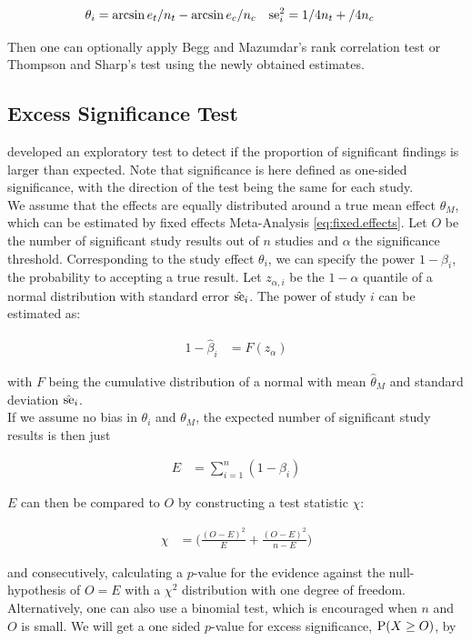 \documentclass[11pt,a4paper,twoside]{book}\usepackage[]{graphicx}\usepackage[]{color}
\begin{document}
\begin{align}
\theta_i &= \arcsin{e_t/n_t} - \arcsin{e_c/n_c} \nonumber &
\se_i^2 &= 1/4n_t + /4n_c \nonumber
\end{align}

Then one can optionally apply Begg and Mazumdar's rank correlation test or Thompson and Sharp's test using the newly obtained estimates.


\subsection{Excess Significance Test} \label{sec:excess.significance}
\citet{excess.significance} developed an exploratory test to detect if the proportion of significant findings is larger than expected. Note that significance is here defined as one-sided significance, with the direction of the test being the same for each study. \\
We assume that the effects are equally distributed around a true mean effect $\theta_M$, which can be estimated by fixed effects Meta-Analysis \ref{eq:fixed.effects}. Let $O$ be the number of significant study results out of $n$ studies and $\alpha$ the significance threshold. Corresponding to the study effect $\theta_i$, we can specify the power $1 - \beta_i$, the probability to accepting a true result. Let $z_{\alpha,i}$ be the $1-\alpha$ quantile of a normal distribution with standard error $\hat{\se}_i$. The power of study $i$ can be estimated as:

\begin{align}
1 - \hat{\beta}_i &= F(z_\alpha) 
\end{align}

with $F$ being the cumulative distribution of a normal with mean $\hat{\theta}_M$ and standard deviation $\hat{\se}_i$. \\
If we assume no bias in $\theta_i$ and $\theta_M$, the expected number of significant study results is then just

\begin{align}
E &= \sum_{i = 1}^n (1 - \beta_i) \nonumber
\end{align}

$E$ can then be compared to $O$ by constructing a test statistic $\chi$:

\begin{align}
\chi  &= \big( \frac{(O - E)^2}{E} + \frac{(O - E)^2}{n - E}\big) \nonumber
\end{align}

and consecutively, calculating a $p$-value for the evidence against the null-hypothesis of $O = E$ with a $\chi^2$ distribution with one degree of freedom. Alternatively, one can also use a binomial test, which is encouraged when $n$ and $O$ is small. We will get a one sided $p$-value for excess significance, $\P(X \geq O)$, by 
\end{document}
